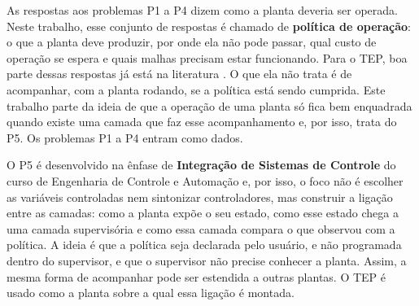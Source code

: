 As respostas aos problemas P1 a P4 dizem como a planta deveria ser operada. Neste trabalho, esse conjunto de respostas é chamado de \textbf{política de operação}: o que a planta deve produzir, por onde ela não pode passar, qual custo de operação se espera e quais malhas precisam estar funcionando. Para o TEP, boa parte dessas respostas já está na literatura \cite{DOWNS1993, Ricker1995, Larsson2001}. O que ela não trata é de acompanhar, com a planta rodando, se a política está sendo cumprida. Este trabalho parte da ideia de que a operação de uma planta só fica bem enquadrada quando existe uma camada que faz esse acompanhamento e, por isso, trata do P5. Os problemas P1 a P4 entram como dados.

O P5 é desenvolvido na ênfase de \textbf{Integração de Sistemas de Controle} do curso de Engenharia de Controle e Automação e, por isso, o foco não é escolher as variáveis controladas nem sintonizar controladores, mas construir a ligação entre as camadas: como a planta expõe o seu estado, como esse estado chega a uma camada supervisória e como essa camada compara o que observou com a política. A ideia é que a política seja declarada pelo usuário, e não programada dentro do supervisor, e que o supervisor não precise conhecer a planta. Assim, a mesma forma de acompanhar pode ser estendida a outras plantas. O TEP é usado como a planta sobre a qual essa ligação é montada.

